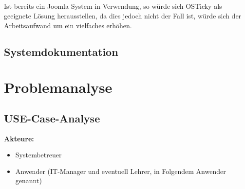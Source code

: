 \paragraph{}
Ist bereits ein Joomla System in Verwendung, so würde sich OSTicky als geeignete Lösung herausstellen, da dies jedoch nicht der Fall ist, würde sich der Arbeitsaufwand um ein vielfaches erhöhen.



\newpage
\section{Systemdokumentation}







\chapter{Problemanalyse}

\section{USE-Case-Analyse}
{\linespread{.5}
	\textbf{Akteure:}
	\begin{itemize}
		\item Systembetreuer
		\item Anwender (IT-Manager und eventuell Lehrer, in Folgendem Anwender genannt)
\end{itemize}}


%

